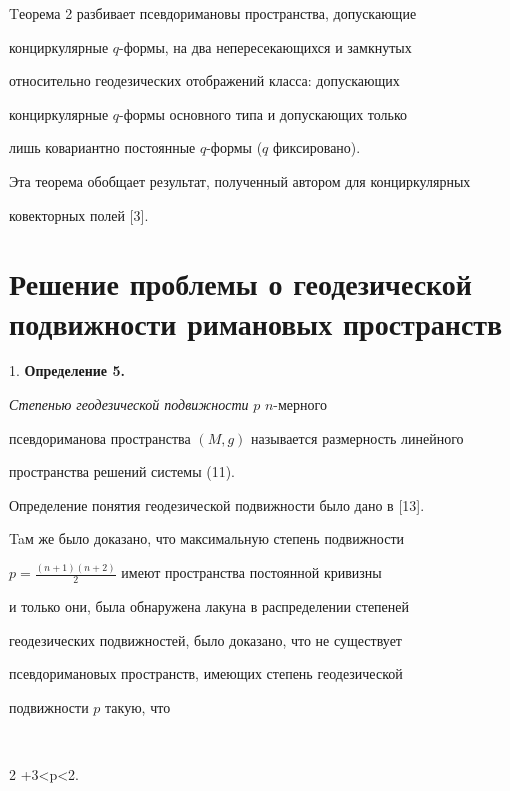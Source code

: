 \begin{note}


Tеорема 2 разбивает псевдоримановы пространства, допускающие 


конциркулярные $q$-формы, на два непересекающихся и замкнутых 


относительно геодезических отображений класса: допускающих 


конциркулярные $q$-формы основного типа и допускающих только 


лишь ковариантно постоянные $q$-формы ($q$ фиксировано).


Эта теорема обобщает результат, полученный автором для конциркулярных 


ковекторных полей [3].


\end{note}





\section{Решение проблемы о геодезической подвижности римановых пространств}





1. {\bf Определение 5.}


{\it Степенью геодезической подвижности} $p$\; $n$-мерного 


псевдориманова пространства $(M, g)$ называется размерность линейного 


пространства решений системы (11).


\medskip





Определение понятия геодезической подвижности было дано в [13].


Taм же было доказано, что максимальную степень подвижности


$p=\frac {(n+1)(n+2)}2$ имеют пространства постоянной кривизны


и только они, была обнаружена лакуна в распределении степеней 


геодезических подвижностей, было доказано, что не существует 


псевдоримановых пространств, имеющих степень геодезической 


подвижности $p$ такую, что


$$


2 +3<p<2.


